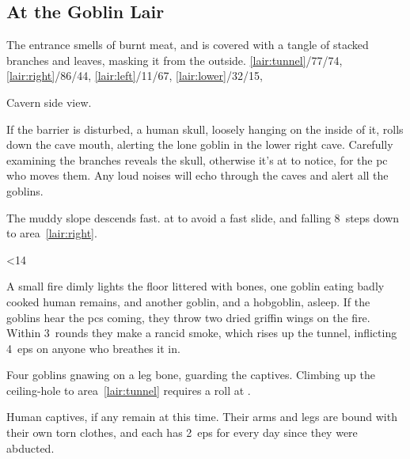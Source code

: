 \documentclass[10pt,twoside]{book}
\begin{document}
\clearpage
\subsection{At the Goblin Lair}
The entrance smells of burnt meat, and is covered with a tangle of stacked branches and leaves, masking it from the outside.
%
  {%
    \ref{lair:tunnel}/77/74,
    \ref{lair:right}/86/44,
    \ref{lair:left}/11/67,
    \ref{lair:lower}/32/15,
  }%
{Cavern side view.\par\null}

If the barrier is disturbed, a human skull, loosely hanging on the inside of it, rolls down the cave mouth, alerting the lone goblin in the lower right cave.
Carefully examining the branches reveals the skull, otherwise it's  at \tn[8] to notice, for the \gls{pc} who moves them.
Any loud noises will echo through the caves and alert all the goblins.


The muddy slope descends fast.
 at \tn[8] to avoid a fast slide, and falling 8~\glspl{step} down to \gls{area}~\ref{lair:right}.%

\ifnum\thepage<14
\fi


A small fire dimly lights the floor littered with bones, one goblin eating badly cooked human remains, and another goblin, and a hobgoblin, asleep.
If the goblins hear the \glspl{pc} coming, they throw two dried \gls{griffin} wings on the fire.
Within 3~\glspl{round} they make a rancid smoke, which rises up the tunnel, inflicting 4~\glspl{ep} on anyone who breathes it in.%

Four goblins gnawing on a leg bone, guarding the captives.
Climbing up the ceiling-hole to \gls{area}~\ref{lair:tunnel} requires a  roll at \tn[12].


Human captives, if any remain at this time.
Their arms and legs are bound with their own torn clothes, and each has 2~\glspl{ep} for every day since they were abducted.
\end{document}

